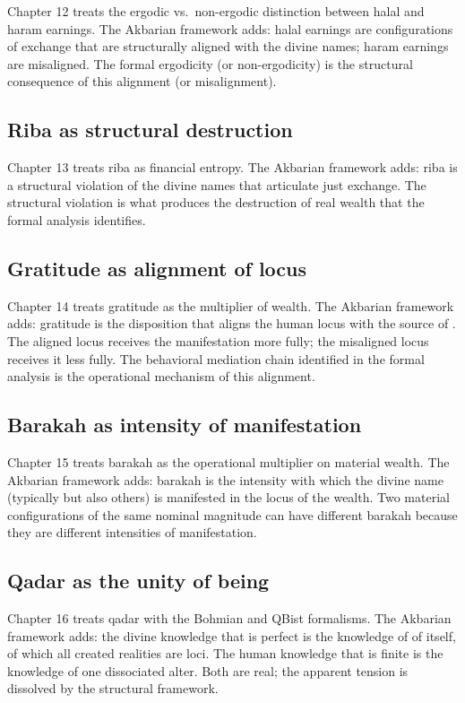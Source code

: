 Chapter 12 treats the ergodic vs.\ non-ergodic distinction between
halal and haram earnings. The Akbarian framework adds: halal
earnings are configurations of exchange that are structurally
aligned with the divine names; haram earnings are misaligned. The
formal ergodicity (or non-ergodicity) is the structural consequence
of this alignment (or misalignment).

\subsection{Riba as structural destruction}

Chapter 13 treats riba as financial entropy. The Akbarian framework
adds: riba is a structural violation of the divine names that
articulate just exchange. The structural violation is what produces
the destruction of real wealth that the formal analysis identifies.

\subsection{Gratitude as alignment of locus}

Chapter 14 treats gratitude as the multiplier of wealth. The
Akbarian framework adds: gratitude is the disposition that aligns
the human locus with the source of . The aligned
locus receives the manifestation more fully; the misaligned locus
receives it less fully. The behavioral mediation chain identified
in the formal analysis is the operational mechanism of this
alignment.

\subsection{Barakah as intensity of manifestation}

Chapter 15 treats barakah as the operational multiplier on material
wealth. The Akbarian framework adds: barakah is the intensity with
which the divine name (typically  but also others)
is manifested in the locus of the wealth. Two material configurations
of the same nominal magnitude can have different barakah because
they are different intensities of manifestation.

\subsection{Qadar as the unity of being}

Chapter 16 treats qadar with the Bohmian and QBist formalisms. The
Akbarian framework adds: the divine knowledge that is perfect is
the knowledge of  of itself, of which all created
realities are loci. The human knowledge that is finite is the
knowledge of one dissociated alter. Both are real; the apparent
tension is dissolved by the structural framework.

